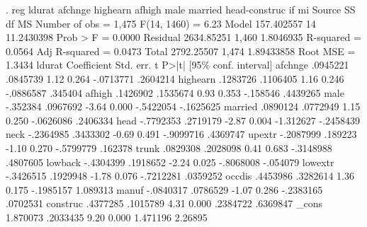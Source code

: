 . reg ldurat afchnge highearn afhigh male married head-construc if mi
{\smallskip}
      Source {\VBAR}       SS           df       MS      Number of obs   =     1,475
   F(14, 1460)     =      6.23
       Model {\VBAR}  157.402557        14  11.2430398   Prob > F        =    0.0000
    Residual {\VBAR}  2634.85251     1,460   1.8046935   R-squared       =    0.0564
   Adj R-squared   =    0.0473
       Total {\VBAR}  2792.25507     1,474  1.89433858   Root MSE        =    1.3434
{\smallskip}
      ldurat {\VBAR} Coefficient  Std. err.      t    P>|t|     [95\% conf. interval]
     afchnge {\VBAR}   .0945221   .0845739     1.12   0.264    -.0713771    .2604214
    highearn {\VBAR}   .1283726   .1106405     1.16   0.246    -.0886587     .345404
      afhigh {\VBAR}   .1426902   .1535674     0.93   0.353     -.158546    .4439265
        male {\VBAR}   -.352384   .0967692    -3.64   0.000    -.5422054   -.1625625
     married {\VBAR}   .0890124   .0772949     1.15   0.250    -.0626086    .2406334
        head {\VBAR}  -.7792353   .2719179    -2.87   0.004    -1.312627   -.2458439
        neck {\VBAR}  -.2364985   .3433302    -0.69   0.491    -.9099716    .4369747
      upextr {\VBAR}  -.2087999    .189223    -1.10   0.270    -.5799779     .162378
       trunk {\VBAR}   .0829308   .2028098     0.41   0.683    -.3148988    .4807605
     lowback {\VBAR}  -.4304399   .1918652    -2.24   0.025    -.8068008    -.054079
     lowextr {\VBAR}  -.3426515   .1929948    -1.78   0.076    -.7212281    .0359252
      occdis {\VBAR}   .4453986   .3282614     1.36   0.175    -.1985157    1.089313
       manuf {\VBAR}  -.0840317   .0786529    -1.07   0.286    -.2383165    .0702531
    construc {\VBAR}   .4377285   .1015789     4.31   0.000     .2384722    .6369847
       _cons {\VBAR}   1.870073   .2033435     9.20   0.000     1.471196     2.26895
{\smallskip}
